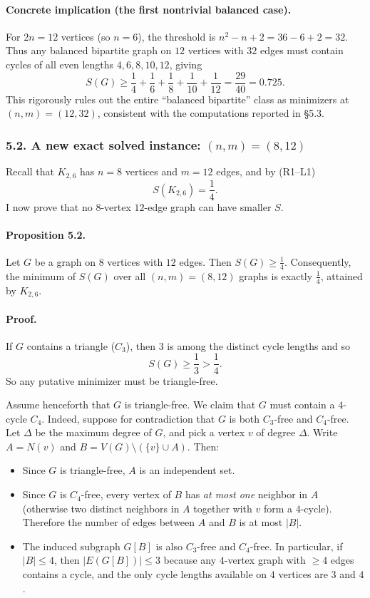 \paragraph{Concrete implication (the first nontrivial balanced case).}
For $2n=12$ vertices (so $n=6$), the threshold is $n^2-n+2=36-6+2=32$.
Thus any balanced bipartite graph on $12$ vertices with $32$ edges must contain cycles of all even lengths $4,6,8,10,12$, giving
\[
S(G)\ge \frac14+\frac16+\frac18+\frac1{10}+\frac1{12}=\frac{29}{40}=0.725.
\]
This rigorously rules out the entire ``balanced bipartite'' class as minimizers at $(n,m)=(12,32)$, consistent with the computations reported in \S5.3.

\subsubsection*{5.2. A new exact solved instance: $(n,m)=(8,12)$}

Recall that $K_{2,6}$ has $n=8$ vertices and $m=12$ edges, and by (R1--L1)
\[
S(K_{2,6})=\frac14.
\]
I now prove that no $8$-vertex $12$-edge graph can have smaller $S$.

\paragraph{Proposition 5.2.}
Let $G$ be a graph on $8$ vertices with $12$ edges. Then $S(G)\ge \tfrac14$.
Consequently, the minimum of $S(G)$ over all $(n,m)=(8,12)$ graphs is exactly $\tfrac14$, attained by $K_{2,6}$.

\paragraph{Proof.}
If $G$ contains a triangle ($C_3$), then $3$ is among the distinct cycle lengths and so
\[
S(G)\ge \frac13>\frac14.
\]
So any putative minimizer must be triangle-free.

Assume henceforth that $G$ is triangle-free.
We claim that $G$ must contain a $4$-cycle $C_4$.
Indeed, suppose for contradiction that $G$ is both $C_3$-free and $C_4$-free.
Let $\Delta$ be the maximum degree of $G$, and pick a vertex $v$ of degree $\Delta$.
Write $A=N(v)$ and $B=V(G)\setminus (\{v\}\cup A)$.
Then:
\begin{itemize}
\item Since $G$ is triangle-free, $A$ is an independent set.
\item Since $G$ is $C_4$-free, every vertex of $B$ has \emph{at most one} neighbor in $A$ (otherwise two distinct neighbors in $A$ together with $v$ form a $4$-cycle).
Therefore the number of edges between $A$ and $B$ is at most $|B|$.
\item The induced subgraph $G[B]$ is also $C_3$-free and $C_4$-free.
In particular, if $|B|\le 4$, then $|E(G[B])|\le 3$ because any $4$-vertex graph with $\ge4$ edges contains a cycle, and the only cycle lengths available on $4$ vertices are $3$ and $4$.
\end{itemize}

